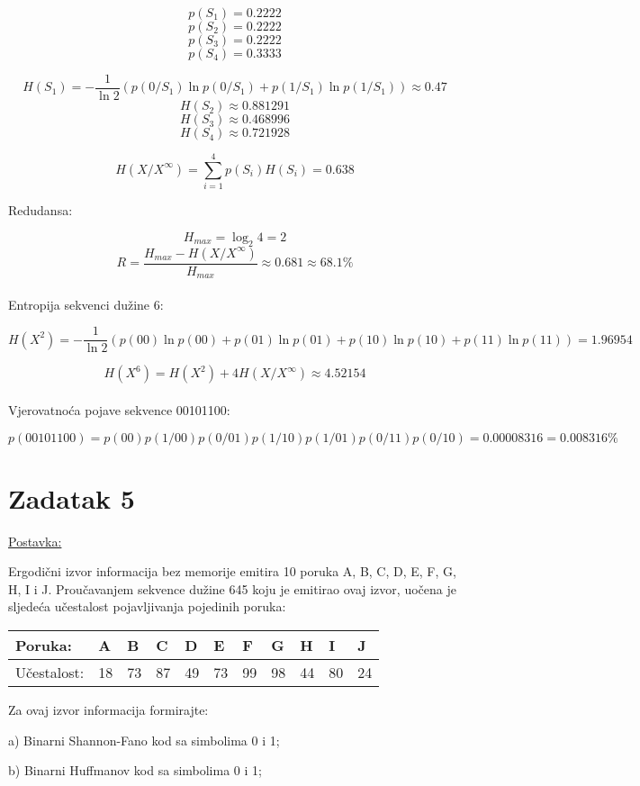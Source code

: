\documentclass[12pt]{article}
\begin{document}
$$p(S_1) = 0.2222$$
$$p(S_2) = 0.2222$$
$$p(S_3) = 0.2222$$
$$p(S_4) = 0.3333$$

$$H(S_1) = - \frac{1}{\ln{2}} (p(0/S_1) \ln{p(0/S_1)} + p(1/S_1) \ln{p(1/S_1)}) \approx 0.47$$
$$H(S_2) \approx 0.881291$$
$$H(S_3) \approx 0.468996$$
$$H(S_4) \approx 0.721928$$

$$H(X/X^{\infty}) = \sum_{i = 1}^{4} p(S_i) H(S_i) = 0.638$$

Redudansa:

$$H_{max} = \log_{2}4 = 2$$
$$R = \frac{H_{max} - H(X/X^{\infty})}{H_{max}} \approx 0.681 \approx 68.1 \%$$ \\

Entropija sekvenci dužine 6:

$$H(X^2) = - \frac{1}{\ln{2}} (p(00) \ln{p(00)} + p(01) \ln{p(01)} + p(10) \ln{p(10)} + p(11) \ln{p(11)}) = 1.96954$$

$$H(X^6) = H(X^2) + 4  H(X/X^{\infty}) \approx 4.52154$$\\

Vjerovatnoća pojave sekvence 00101100:

$$p(00101100) = p(00) p(1/00)p(0/01)p(1/10)p(1/01)p(0/11)p(0/10) = 0.00008316 = 0.008316\%$$


\newpage

\section*{Zadatak 5\label{Z5}}

\underline{Postavka:}

Ergodični izvor informacija bez memorije emitira 10 poruka A, B, C, D, E, F, G, H, I i J. Proučavanjem sekvence dužine 645 koju je emitirao ovaj izvor, uočena je sljedeća učestalost pojavljivanja pojedinih poruka: 

\begin{table}[hp]
\centering
\begin{tabular}{|l|l|l|l|l|l|l|l|l|l|l|}
\hline
Poruka:     & A  & B  & C  & D  & E  & F  & G  & H  & I  & J  \\ \hline
Učestalost: & 18 & 73 & 87 & 49 & 73 & 99 & 98 & 44 & 80 & 24 \\ \hline
\end{tabular}
\end{table}

Za ovaj izvor informacija formirajte:

a) Binarni Shannon-Fano kod sa simbolima 0 i 1;

b) Binarni Huffmanov kod sa simbolima 0 i 1;
\end{document}
